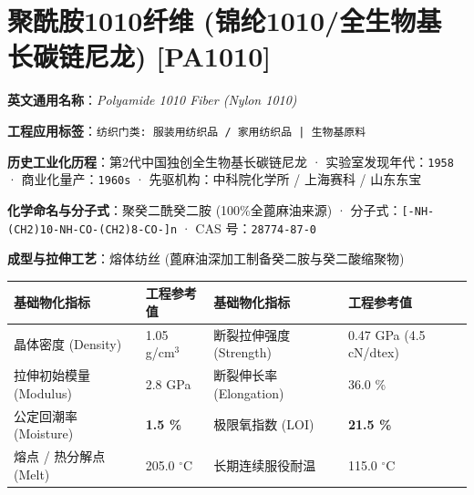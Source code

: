 \documentclass[11pt,openright,twoside,UTF8]{ctexbook}
\begin{document}
\section{聚酰胺1010纤维 (锦纶1010/全生物基长碳链尼龙) [PA1010]}
\label{sec:pa1010}

\noindent\textbf{英文通用名称}：\textit{Polyamide 1010 Fiber (Nylon 1010)}\par
\noindent\textbf{工程应用标签}：\texttt{纺织门类: 服装用纺织品 / 家用纺织品 | 生物基原料}\par
\noindent\textbf{历史工业化历程}：第2代中国独创全生物基长碳链尼龙 · 实验室发现年代：\texttt{1958} · 商业化量产：\texttt{1960s} · 先驱机构：中科院化学所 / 上海赛科 / 山东东宝\par
\noindent\textbf{化学命名与分子式}：聚癸二酰癸二胺 (100\%全蓖麻油来源) · 分子式：\texttt{[-NH-(CH2)10-NH-CO-(CH2)8-CO-]n} · CAS 号：\texttt{28774-87-0}\par
\noindent\textbf{成型与拉伸工艺}：熔体纺丝 (蓖麻油深加工制备癸二胺与癸二酸缩聚物)\par

\vspace{0.15cm}
\begin{center}
\small
\begin{tabularx}{\textwidth}{p{3.8cm}Xp{3.8cm}X}
\toprule
\textbf{基础物化指标} & \textbf{工程参考值} & \textbf{基础物化指标} & \textbf{工程参考值} \\
\midrule
晶体密度 (Density) & 1.05 g/cm$^3$ & 断裂拉伸强度 (Strength) & 0.47 GPa (4.5 cN/dtex) \\
拉伸初始模量 (Modulus) & 2.8 GPa & 断裂伸长率 (Elongation) & 36.0 \% \\
公定回潮率 (Moisture) & \textbf{1.5 \%} & 极限氧指数 (LOI) & \textbf{21.5 \%} \\
熔点 / 热分解点 (Melt) & 205.0 $^\circ\mathrm{C}$ & 长期连续服役耐温 & 115.0 $^\circ\mathrm{C}$ \\
\bottomrule
\end{tabularx}
\end{center}
\vspace{0.15cm}
\end{document}
